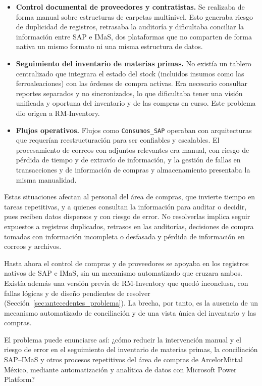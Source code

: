 \begin{itemize}
\item \textbf{Control documental de proveedores y contratistas.} Se realizaba de forma manual sobre estructuras de carpetas multinivel. Esto generaba riesgo de duplicidad de registros, retrasaba la auditoría y dificultaba conciliar la información entre SAP e IMaS, dos plataformas que no comparten de forma nativa un mismo formato ni una misma estructura de datos.
 
\item \textbf{Seguimiento del inventario de materias primas.} No existía un tablero centralizado que integrara el estado del stock (incluidos insumos como las ferroaleaciones) con las órdenes de compra activas. Era necesario consultar reportes separados y no sincronizados, lo que dificultaba tener una visión unificada y oportuna del inventario y de las compras en curso. Este problema dio origen a RM-Inventory.
 
\item \textbf{Flujos operativos.} Flujos como \texttt{Consumos\_SAP} operaban con arquitecturas que requerían reestructuración para ser confiables y escalables. El procesamiento de correos con adjuntos relevantes era manual, con riesgo de pérdida de tiempo y de extravío de información, y la gestión de fallas en transacciones y de información de compras y almacenamiento presentaba la misma manualidad.
\end{itemize}
 
Estas situaciones afectan al personal del área de compras, que invierte tiempo en tareas repetitivas, y a quienes consultan la información para auditar o decidir, pues reciben datos dispersos y con riesgo de error. No resolverlas implica seguir expuestos a registros duplicados, retrasos en las auditorías, decisiones de compra tomadas con información incompleta o desfasada y pérdida de información en correos y archivos.
 
Hasta ahora el control de compras y de proveedores se apoyaba en los registros nativos de SAP e IMaS, sin un mecanismo automatizado que cruzara ambos. Existía además una versión previa de RM-Inventory que quedó inconclusa, con fallas lógicas y de diseño pendientes de resolver (Sección~\ref{sec:antecedentes_problema}). La brecha, por tanto, es la ausencia de un mecanismo automatizado de conciliación y de una vista única del inventario y las compras.
 
El problema puede enunciarse así: ¿cómo reducir la intervención manual y el riesgo de error en el seguimiento del inventario de materias primas, la conciliación SAP--IMaS y otros procesos repetitivos del área de compras de ArcelorMittal México, mediante automatización y analítica de datos con Microsoft Power Platform?

